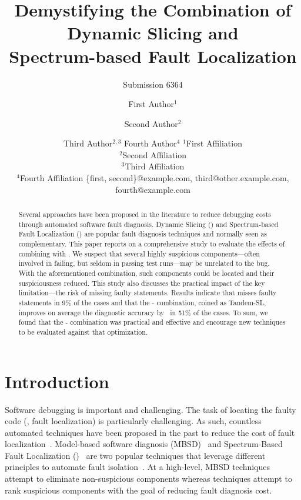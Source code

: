 \documentclass{article}
\title{Demystifying the Combination of Dynamic Slicing and \\ Spectrum-based Fault
Localization}
\author{
    Submission 6364
}
\author{
First Author$^1$
\and
Second Author$^2$\and
Third Author$^{2,3}$\And
Fourth Author$^4$
\affiliations
$^1$First Affiliation\\
$^2$Second Affiliation\\
$^3$Third Affiliation\\
$^4$Fourth Affiliation
\emails
\{first, second\}@example.com,
third@other.example.com,
fourth@example.com
}
\begin{document}
\maketitle

\begin{abstract}
Several approaches have been proposed in the literature to reduce
debugging costs through automated software fault diagnosis.  Dynamic
Slicing (\ds{}) and Spectrum-based Fault Localization (\sfl{}) are
popular fault diagnosis techniques and normally seen as complementary.
This paper reports on a comprehensive study
to evaluate the effects of combining \ds{} with \sfl{}. We suspect
that several highly suspicious components---often involved in failing,
but seldom in passing test runs---may be unrelated to the bug. With
the aforementioned combination, such components could be located and
their suspiciousness reduced.  This study also discusses the practical
impact of the \ds{} key limitation---the risk of missing faulty
statements. Results indicate that \ds{} misses faulty statements in
 9\% of the \numFaults{} cases and that
the \ds{}-\sfl{} combination, coined as Tandem-SL, improves on average
the diagnostic accuracy by \avgImprov\ in 51\% of the cases. To sum,
we found that the \ds{}-\sfl{} combination was practical and effective
and encourage new \sfl{} techniques to be evaluated against that
optimization.
\end{abstract}


\section{Introduction}

Software debugging is important and challenging. The task of locating
the faulty code (\ie{}, fault localization) is particularly
challenging. As such, countless automated techniques have been
proposed in the past to reduce the cost of fault
localization~\cite{7390282}. Model-based software diagnosis
(MBSD)~\cite{REITER198757,DEKLEER200325} and Spectrum-Based Fault
Localization (\sfl{})~\cite{DBLP:journals/stvr/HarroldRSWY00} are two
popular techniques that leverage different principles to automate
fault isolation~\cite{DBLP:conf/sac/AbreuGZG08}.  At a high-level,
MBSD
techniques~\cite{wotawa2002model,Mayer:2008:EMM:1642931.1642950,mayer2008prioritising,Perez:2018:LQR:3304889.3304927,Ko:2008:DRA:1368088.1368130}
attempt to eliminate non-suspicious components whereas \sfl{}
techniques attempt to rank suspicious components with the goal of
reducing fault diagnosis cost.
\end{document}
